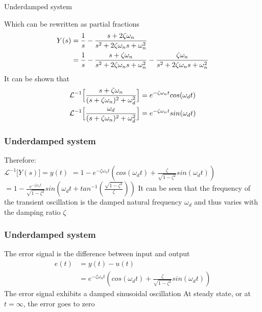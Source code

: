 \begin{frame}{Underdamped system}

Which can be rewritten as partial fractions\\
\vspace{-0.5cm}
\begin{align*}
Y(s)&=\frac{1}{s} -\frac{s+2\zeta\omega_n}{s^2+2\zeta\omega_n s+ \omega_n ^2} \\ \vspace{2cm}
&= \frac{1}{s} -\frac{s+\zeta\omega_n}{s^2+2\zeta\omega_n s+ \omega_n ^2} -\frac{\zeta\omega_n}{s^2+2\zeta\omega_n s+ \omega_n ^2}
\end{align*}
It can be shown that\\ 
\begin{align*}
\mathcal{L}^{-1}\Big[\frac{s+\zeta\omega_n}{(s+\zeta\omega_n)^2+\omega_d ^2}\Big]&= e^{-\zeta\omega_n t}cos(\omega_d t)\\  \vspace{2cm}
\mathcal{L}^{-1}\Big[\frac{\omega_d}{(s+\zeta\omega_n)^2+\omega_d ^2}\Big]&= e^{-\zeta\omega_n t}sin(\omega_d t)
\end{align*}
\end{frame}



\begin{frame}
\frametitle{Underdamped system}
Therefore:\\ 
\vspace{0.25cm}
$\mathcal{L}^{-1}\Big[Y(s)\Big]=y(t)$
\vspace{0.35cm}
$ = 1 - e^{-\zeta\omega_n t}(cos(\omega_d t)+\frac{\zeta}{\sqrt{1 - \zeta^2}}sin(\omega_d t))$
\vspace{0.25cm}
$ = 1 - \frac{e^{-\zeta\omega_n t}}{\sqrt{1-\zeta^2}}sin(\omega_d t+ tan^{-1}(\frac{\sqrt{1-\zeta^2}}{\zeta}))$
\vspace{0.4cm}
It can be seen that the frequency of the transient oscillation is the damped natural frequency $\omega_d$ and thus varies with the damping ratio $\zeta$
\end{frame}

\begin{frame}
\frametitle{Underdamped system}
The error signal is the difference between input and output
\begin{align*}
e(t)&= y(t) -u(t)\\
&= e^{-\zeta\omega_n t}(cos(\omega_d t)+\frac{\zeta}{\sqrt{1 - \zeta^2}}sin(\omega_d t))
\end{align*}
The error signal exhibits a damped sinusoidal oscillation
\vspace{0.8cm}
At steady state, or at $t=\infty$, the error goes to zero
\end{frame}

